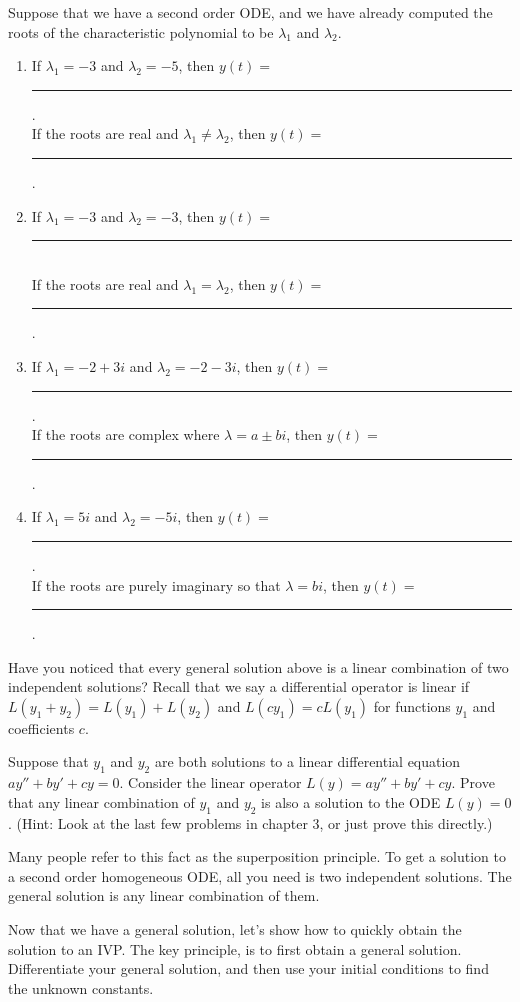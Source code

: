 \begin{problem*}[5.19 Improved]
 Suppose that we have a second order ODE, and we have already computed the roots of the characteristic polynomial to be $\lambda_1$ and $\lambda_2$. 
\begin{enumerate}
 \item If $\lambda_1=-3$ and $\lambda_2=-5$, then $y(t) = $\rule{1in}{.5pt}.\\
 If the roots are real and $\lambda_1 \neq \lambda_2$, then $y(t) = $\rule{1in}{.5pt}.
 \item If $\lambda_1=-3$ and $\lambda_2=-3$, then $y(t) = $\rule{1in}{.5pt}\\
 If the roots are real and $\lambda_1  =   \lambda_2$, then $y(t) = $\rule{1in}{.5pt}.
 \item If $\lambda_1 = -2+3i$ and $\lambda_2=-2-3i$, then $y(t) = $\rule{1in}{.5pt}. \\
 If the roots are complex where $\lambda = a\pm bi$, then $y(t) = $\rule{1in}{.5pt}.
 \item If $\lambda_1 = 5i$ and $\lambda_2=-5i$, then $y(t) = $\rule{1in}{.5pt}. \\
 If the roots are purely imaginary so that $\lambda = bi$, then $y(t) = $\rule{1in}{.5pt}.
\end{enumerate}

\end{problem*}

Have you noticed that every general solution above is a linear combination of two independent solutions?  Recall that we say a differential operator is linear if $L(y_1+y_2) = L(y_1)+L(y_2)$ and $L(cy_1)=cL(y_1)$ for functions $y_1$ and coefficients $c$.  
\begin{problem}\label{superposition principle}
 Suppose that $y_1$ and $y_2$ are both solutions to a linear differential equation $ay''+b y'+cy=0$.  Consider the linear operator $L(y) = ay''+by'+cy$.  Prove that any linear combination of $y_1$ and $y_2$ is also a solution to the ODE $L(y)=0$. (Hint:  Look at the last few problems in chapter 3, or just prove this directly.)  

 Many people refer to this fact as the superposition principle. To get a solution to a second order homogeneous ODE, all you need is two independent solutions. The general solution is any linear combination of them.
\end{problem}

Now that we have a general solution, let's show how to quickly obtain the solution to an IVP. The key principle, is to first obtain a general solution. Differentiate your general solution, and then use your initial conditions to find the unknown constants.

